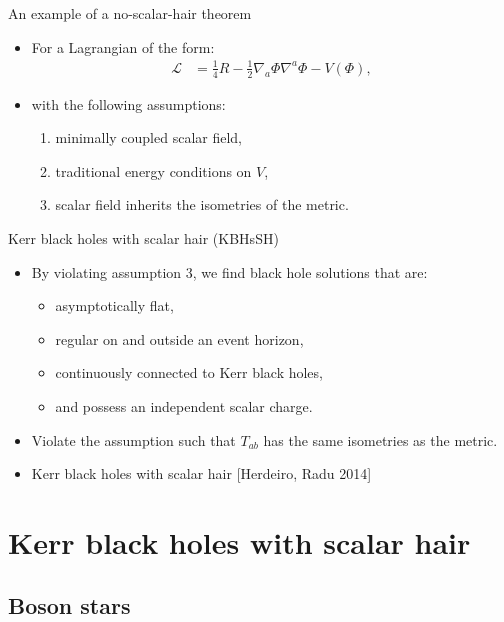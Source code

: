 \documentclass[xcolor=dvipsnames]{beamer}
\begin{document}
\begin{frame}{An example of a no-scalar-hair theorem}
  \begin{itemize}[<+->]
    \item For a Lagrangian of the form:
      \begin{align*}
        \mathcal{L} &= \frac{1}{4}R - \frac{1}{2}\nabla_a \Phi \nabla^a \Phi - V\left( \Phi \right),
      \end{align*}
    \item with the following assumptions:
      \begin{enumerate}
        \item minimally coupled scalar field,
        \item traditional energy conditions on $V$,
        \item scalar field inherits the isometries of the metric.
      \end{enumerate}
  \end{itemize}
\end{frame}

\begin{frame}{Kerr black holes with scalar hair (KBHsSH)}
  \begin{itemize}[<+->]
    \item By violating assumption 3, we find black hole solutions that are:
      \begin{itemize}
        \item asymptotically flat,
        \item regular on and outside an event horizon,
        \item continuously connected to Kerr black holes,
        \item and possess an independent scalar charge.
      \end{itemize}
    \item Violate the assumption such that $T_{ab}$ has the same isometries as the metric.
    \item Kerr black holes with scalar hair \tiny{[Herdeiro, Radu 2014]}
  \end{itemize}
\end{frame}

\section{Kerr black holes with scalar hair}
\subsection{Boson stars}
\begin{frame}
  \tableofcontents[currentsubsection]
\end{frame}
\end{document}
